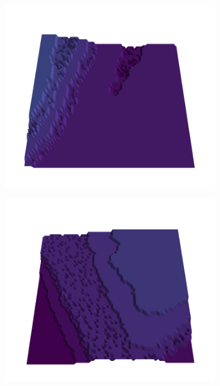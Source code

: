 \documentclass[../document.tex]{subfiles}
\begin{document}
\begin{figure}[H]
    \begin{subfigure}[b]{0.19\textwidth}
        \includegraphics[width=\linewidth]{../img/5/quarry/best//patch-3d-majavi-colormap-2.png}
    \end{subfigure}
    \begin{subfigure}[b]{0.19\textwidth}
        \includegraphics[width=\linewidth]{../img/5/quarry/best//patch-3d-majavi-colormap-3.png}
    \end{subfigure}  

\end{figure}
\end{document}
